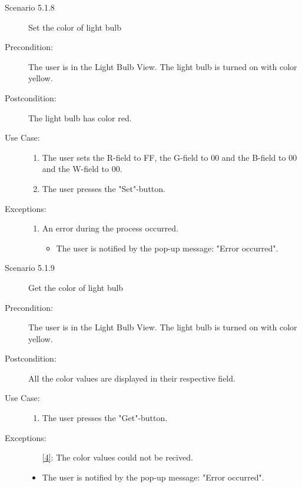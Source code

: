 \documentclass[a4paper]{article}
\begin{document}
\begin{description}
\item[Scenario 5.1.8] Set the color of light bulb
\item[Precondition:] The user is in the Light Bulb View. The light bulb is turned on with color yellow.
\item[Postcondition:] The light bulb has color red.
\item[Use Case:]\mbox{}
\begin{enumerate}
\item  \label{4} The user sets the R-field to FF, the G-field to 00 and the B-field to 00 and the W-field to 00.
\item The user presses the "Set"-button.

\end{enumerate}

\item[Exceptions:]
\item[]
\begin{enumerate}
\item An error during the process occurred.
\begin{itemize}
\item The user is notified by the pop-up message: "Error occurred".
\end{itemize}
\end{enumerate}

\item[]

\item[Scenario 5.1.9] Get the color of light bulb
\item[Precondition:] The user is in the Light Bulb View. The light bulb is turned on with color yellow.
\item[Postcondition:] All the color values are displayed in their respective field.
\item[Use Case:]\mbox{}
\begin{enumerate}
\item  \label{4} The user presses the "Get"-button.
\end{enumerate}

\item[Exceptions:]
\item[]

\begin{itemize}
\item [\ref{4}:] The color values could not be recived.
\item The user is notified by the pop-up message: "Error occurred".
\end{itemize}


\end{description}
\end{document}

